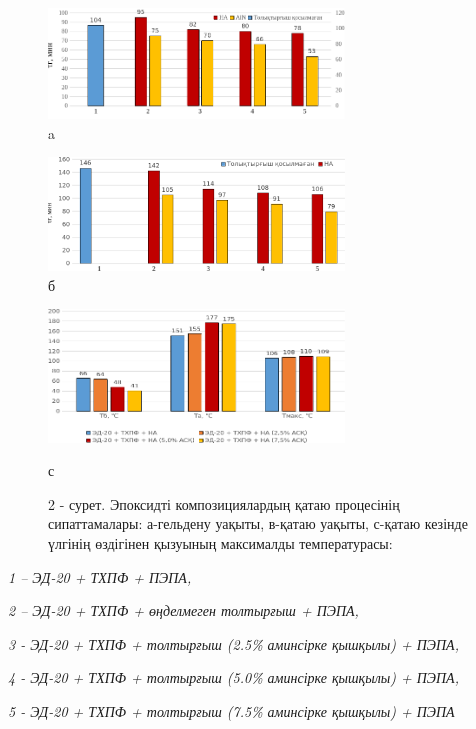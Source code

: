 \begin{figure}[H]
	\centering
	\includegraphics[width=0.7\textwidth]{media/chem/image102}
	\caption*{a}
\end{figure}
\begin{figure}[H]
	\centering
	\includegraphics[width=0.7\textwidth]{media/chem/image103}
	\caption*{б}
\end{figure}
\begin{figure}[H]
	\centering
	\includegraphics[width=0.7\textwidth]{media/chem/image104}
    \caption*{с}
    \caption*{2 - сурет. Эпоксидті композициялардың қатаю процесінің
сипаттамалары: а-гельдену уақыты, в-қатаю уақыты, с-қатаю кезінде
үлгінің өздігінен қызуының максималды температурасы:}
\end{figure}

\begin{center}
\emph{1 -- ЭД-20 + ТХПФ + ПЭПА,}

\emph{2 -- ЭД-20 + ТХПФ + өңделмеген толтырғыш + ПЭПА,}

\emph{3 - ЭД-20 + ТХПФ + толтырғыш (2.5\% аминсірке қышқылы) + ПЭПА,}

\emph{4 - ЭД-20 + ТХПФ + толтырғыш (5.0\% аминсірке қышқылы) + ПЭПА,}

\emph{5 - ЭД-20 + ТХПФ + толтырғыш (7.5\% аминсірке қышқылы) + ПЭПА}
\end{center}

